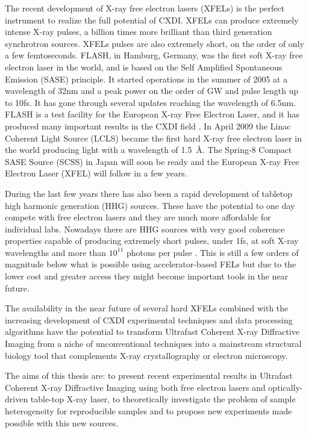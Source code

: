 The recent development of X-ray free electron lasers (XFELs) is the perfect
instrument to realize the full potential of CXDI. XFELs can produce extremely
intense X-ray pulses, a billion times more brilliant than third
generation synchrotron sources. XFELs pulses are also extremely short, on the order of
only a few femtoseconds. FLASH, in Hamburg, Germany, was the first soft X-ray
free electron laser in the world, and is based on the Self Amplified Spontaneous
Emission (SASE) principle. It started operations in the summer of 2005 at
a wavelength of 32nm and a peak power on the order of GW and pulse length up to
10fs. It has gone through several updates reaching the wavelength of
6.5nm. FLASH is a test facility for the European X-ray Free Electron
Laser, and it has produced many important results in the CXDI field \cite{Cowboys, Chapman Holography}. In April 2009 the Linac Coherent Light Source (LCLS)
became the first hard X-ray free electron laser in the world producing light
with a wavelength of \mbox{1.5 \AA}. The Spring-8 Compact SASE Source (SCSS) in
Japan will soon be ready and the European X-ray Free Electron Laser (XFEL)
will follow in a few years.

During the last few years there has also been a rapid development of tabletop
high harmonic generation (HHG) sources. These have the potential to one day
compete with free electron lasers and they are much more affordable for
individual labs. Nowadays there are HHG sources with very good coherence
properties capable of producing extremely short pulses, under 1fs, at soft X-ray wavelengths and more than $10^{11}$ photons
per pulse \cite{Ravasio}. This is still a few orders of magnitude below what is
possible using accelerator-based FELs but due to the lower cost and greater access they might
become important tools in the near future.

The availability in the near future of several hard XFELs combined with the
increasing development of CXDI experimental techniques and data processing
algorithms have the potential to transform Ultrafast Coherent X-ray Diffractive
Imaging from a niche of unconventional techniques into a mainstream structural
biology tool that complements X-ray crystallography or electron microscopy.


The aims of this thesis are: to present recent experimental results in Ultrafast
Coherent X-ray Diffractive Imaging using both free electron lasers and
optically-driven table-top X-ray laser, to theoretically investigate the problem of sample heterogeneity
for reproducible samples and to propose new experiments made possible with this
new sources.
